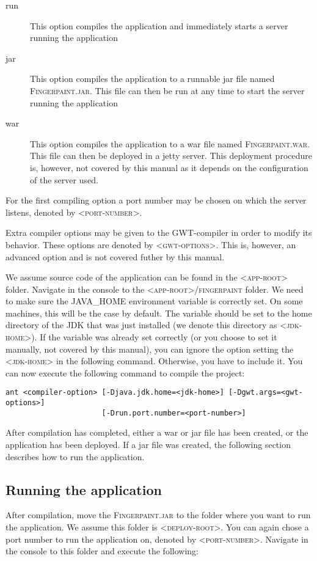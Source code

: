 \begin{description}
  \item[run] This option compiles the application and immediately starts a server running the application
  \item[jar] This option compiles the application to a runnable jar file named \textsc{Fingerpaint.jar}. This file can then be run at any time to start the server running the application
  \item[war] This option compiles the application to a war file named \textsc{Fingerpaint.war}. This file can then be deployed in a jetty server. This deployment procedure is, however, not covered by this manual as it depends on the configuration of the server used.
\end{description}

For the first compiling option a port number may be chosen on which the server listens, denoted by \textsc{<port-number>}.

Extra compiler options may be given to the GWT-compiler in order to modify its behavior. These options are denoted by \textsc{<gwt-options>}. This is, however, an advanced option and is not covered futher by this manual.

We assume source code of the application can be found in the \textsc{<app-root>} folder.
Navigate in the console to the \textsc{<app-root>/fingerpaint} folder. 
We need to make sure the \textsc{JAVA\_HOME} environment variable is correctly set. On some machines, this will be the case by default. The variable should be set to the home directory of the JDK that was just installed (we denote this directory as \textsc{<jdk-home>}). If the variable was already set correctly (or you choose to set it manually, not covered by this manual), you can ignore the option setting the \textsc{<jdk-home>} in the following command. Otherwise, you have to include it. You can now execute the following command to compile the project:

\begin{verbatim}
ant <compiler-option> [-Djava.jdk.home=<jdk-home>] [-Dgwt.args=<gwt-options>] 
                      [-Drun.port.number=<port-number>]
\end{verbatim}

After compilation has completed, either a war or jar file has been created, or the application has been deployed. If a jar file was created, the following section describes how to run the application.

\subsection{Running the application}
\label{sec:running}
After compilation, move the \textsc{Fingerpaint.jar} to the folder where you want to run the application. We assume this folder is \textsc{<deploy-root>}. You can again chose a port number to run the application on, denoted by \textsc{<port-number>}. Navigate in the console to this folder and execute the following:

